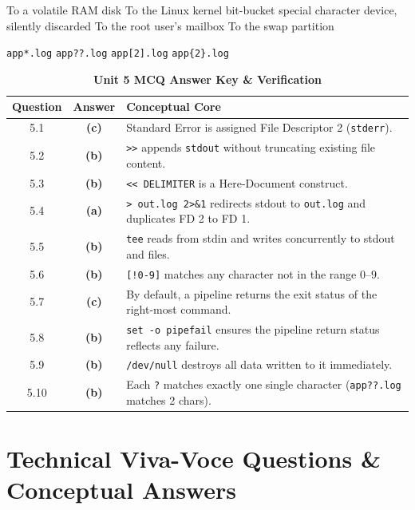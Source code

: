 {To a volatile RAM disk}
{To the Linux kernel bit-bucket special character device, silently discarded}
{To the root user's mailbox}
{To the swap partition}

{\texttt{app*.log}}
{\texttt{app??.log}}
{\texttt{app[2].log}}
{\texttt{app\{2\}.log}}

\begin{table}[htbp]
\centering
\caption{\textbf{Unit 5 MCQ Answer Key \& Verification}}
\begin{tabularx}{0.85\linewidth}{c c X}
\toprule
\textbf{Question} & \textbf{Answer} & \textbf{Conceptual Core} \\
\midrule
5.1 & \textbf{(c)} & Standard Error is assigned File Descriptor 2 (\texttt{stderr}). \\
5.2 & \textbf{(b)} & \texttt{>>} appends \texttt{stdout} without truncating existing file content. \\
5.3 & \textbf{(b)} & \texttt{<< DELIMITER} is a Here-Document construct. \\
5.4 & \textbf{(a)} & \texttt{> out.log 2>\&1} redirects stdout to \texttt{out.log} and duplicates FD 2 to FD 1. \\
5.5 & \textbf{(b)} & \texttt{tee} reads from stdin and writes concurrently to stdout and files. \\
5.6 & \textbf{(b)} & \texttt{[!0-9]} matches any character not in the range $0$--$9$. \\
5.7 & \textbf{(c)} & By default, a pipeline returns the exit status of the right-most command. \\
5.8 & \textbf{(b)} & \texttt{set -o pipefail} ensures the pipeline return status reflects any failure. \\
5.9 & \textbf{(b)} & \texttt{/dev/null} destroys all data written to it immediately. \\
5.10 & \textbf{(b)} & Each \texttt{?} matches exactly one single character (\texttt{app??.log} matches 2 chars). \\
\bottomrule
\end{tabularx}
\end{table}

\section{Technical Viva-Voce Questions \& Conceptual Answers}


